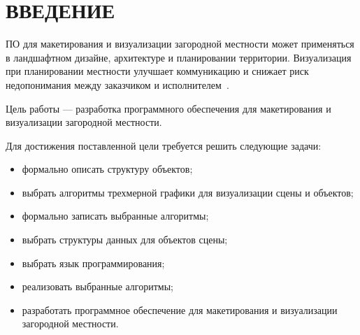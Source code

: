 \chapter*{ВВЕДЕНИЕ}

ПО для макетирования и визуализации загородной местности может применяться в ландшафтном дизайне, архитектуре и планировании территории.
Визуализация при планировании местности улучшает коммуникацию и снижает риск недопонимания между заказчиком и исполнителем~\cite{intro_visualization}.

Цель работы --- разработка программного обеспечения для макетирования и визуализации загородной местности.

Для достижения поставленной цели требуется решить следующие задачи:
\begin{itemize}
	\item формально описать структуру объектов;
	\item выбрать алгоритмы трехмерной графики для визуализации сцены и объектов;
	\item формально записать выбранные алгоритмы;
	\item выбрать структуры данных для объектов сцены;
	\item выбрать язык программирования;
	\item реализовать выбранные алгоритмы;
	\item разработать программное обеспечение для макетирования и визуализации загородной местности.
\end{itemize}
